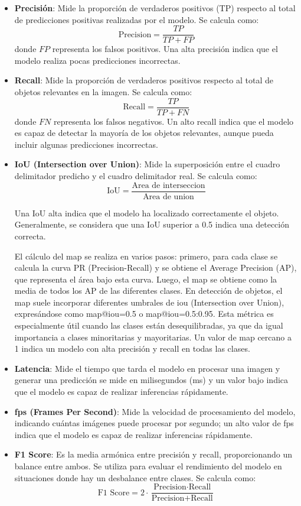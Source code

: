 \documentclass[11pt,spanish,listoffigures,listoftables]{tfgetsinf}
\begin{document}
\begin{itemize}
   \item \textbf{Precisión}: Mide la proporción de verdaderos positivos (TP) respecto al total de predicciones positivas realizadas por el modelo. Se calcula como:
   \[
   \text{Precision} = \frac{TP}{TP + FP}
   \]
   donde $FP$ representa los falsos positivos. Una alta precisión indica que el modelo realiza pocas predicciones incorrectas.

   \item \textbf{Recall}: Mide la proporción de verdaderos positivos respecto al total de objetos relevantes en la imagen. Se calcula como:
   \[
   \text{Recall} = \frac{TP}{TP + FN}
   \]
   donde $FN$ representa los falsos negativos. Un alto recall indica que el modelo es capaz de detectar la mayoría de los objetos relevantes, aunque pueda incluir algunas predicciones incorrectas.

   \item \textbf{IoU (Intersection over Union)}: Mide la superposición entre el cuadro delimitador predicho y el cuadro delimitador real. Se calcula como:
   \[
   \text{IoU} = \frac{\text{Area de interseccion}}{\text{Area de union}}
   \]

   Una IoU alta indica que el modelo ha localizado correctamente el objeto. Generalmente, se considera que una IoU superior a 0.5 indica una detección correcta.

   El cálculo del \gls{map} se realiza en varios pasos: primero, para cada clase se calcula la curva PR (Precision-Recall) y se obtiene el Average Precision (AP), que representa el área bajo esta curva. Luego, el \gls{map} se obtiene como la media de todos los AP de las diferentes clases. En detección de objetos, el \gls{map} suele incorporar diferentes umbrales de \gls{iou} (Intersection over Union), expresándose como \gls{map}@\gls{iou}=0.5 o \gls{map}@\gls{iou}=0.5:0.95. Esta métrica es especialmente útil cuando las clases están desequilibradas, ya que da igual importancia a clases minoritarias y mayoritarias. Un valor de \gls{map} cercano a 1 indica un modelo con alta precisión y recall en todas las clases.

   \item \textbf{Latencia}: Mide el tiempo que tarda el modelo en procesar una imagen y generar una predicción se mide en milisegundos (ms) y un valor bajo indica que el modelo es capaz de realizar inferencias rápidamente.
   
   \item \textbf{\gls{fps} (Frames Per Second)}: Mide la velocidad de procesamiento del modelo, indicando cuántas imágenes puede procesar por segundo; un alto valor de \gls{fps} indica que el modelo es capaz de realizar inferencias rápidamente.
   \item \textbf{F1 Score}: Es la media armónica entre precisión y recall, proporcionando un balance entre ambos. Se utiliza para evaluar el rendimiento del modelo en situaciones donde hay un desbalance entre clases. Se calcula como:
   \[
   \text{F1 Score} = 2 \cdot \frac{\text{Precision} \cdot \text{Recall}}{\text{Precision} + \text{Recall}}
   \]


\end{itemize}
\end{document}
